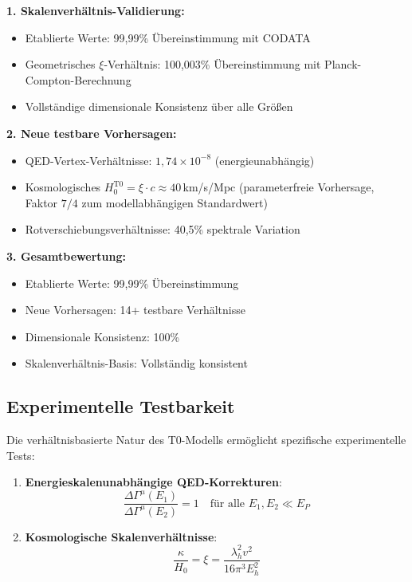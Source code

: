 \documentclass[12pt,a4paper]{article}
\begin{document}
	\begin{tcolorbox}[colback=green!5!white,colframe=green!75!black,title=Hauptergebnisse der T0-Verifikation]
		\textbf{1. Skalenverhältnis-Validierung:}
		\begin{itemize}
			\item Etablierte Werte: 99,99\% Übereinstimmung mit CODATA
			\item Geometrisches $\xi$-Verhältnis: 100,003\% Übereinstimmung mit Planck-Compton-Berechnung
			\item Vollständige dimensionale Konsistenz über alle Größen
		\end{itemize}
		
		\textbf{2. Neue testbare Vorhersagen:}
		\begin{itemize}
			\item QED-Vertex-Verhältnisse: $1,74 \times 10^{-8}$ (energieunabhängig)
			\item Kosmologisches $H_0^{\text{T0}} = \xi \cdot c \approx 40\,$km/s/Mpc (parameterfreie Vorhersage, Faktor $7/4$ zum modellabhängigen Standardwert)
			\item Rotverschiebungsverhältnisse: 40,5\% spektrale Variation
		\end{itemize}
		
		\textbf{3. Gesamtbewertung:}
		\begin{itemize}
			\item Etablierte Werte: 99,99\% Übereinstimmung
			\item Neue Vorhersagen: 14+ testbare Verhältnisse
			\item Dimensionale Konsistenz: 100\%
			\item Skalenverhältnis-Basis: Vollständig konsistent
		\end{itemize}
	\end{tcolorbox}
	
	\subsection{Experimentelle Testbarkeit}
	
	Die verhältnisbasierte Natur des T0-Modells ermöglicht spezifische experimentelle Tests:
	
	\begin{enumerate}
		\item \textbf{Energieskalenunabhängige QED-Korrekturen}:
		\begin{equation}
			\frac{\Delta\Gamma^{\mu}(E_1)}{\Delta\Gamma^{\mu}(E_2)} = 1 \quad \text{für alle } E_1, E_2 \ll E_P
		\end{equation}
		
		\item \textbf{Kosmologische Skalenverhältnisse}:
		\begin{equation}
			\frac{\kappa}{H_0} = \xi = \frac{\lambda_h^2 v^2}{16\pi^3 E_h^2}
		\end{equation}
	\end{enumerate}
	
\end{document}
